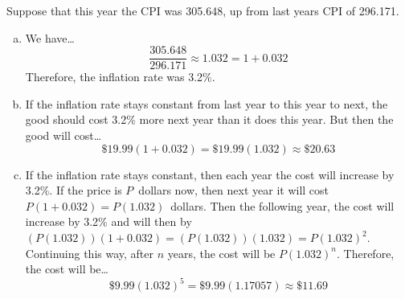 \documentclass[12pt,letterpaper]{exam}
\begin{document}
\begin{questions}
\newpage
\question Suppose that this year the CPI was 305.648, up from last years CPI of 296.171. 
	 \pspace

{\itshape
\sol 
\begin{enumerate}[(a)]
\item We have\dots
	\[
	\dfrac{305.648}{296.171} \approx 1.032= 1 + 0.032
	\] \pspace
Therefore, the inflation rate was 3.2\%. \pspace

\item If the inflation rate stays constant from last year to this year to next, the good should cost 3.2\% more next year than it does this year. But then the good will cost\dots
	\[
	\$19.99 (1 + 0.032)= \$19.99 (1.032) \approx \$20.63 
	\] \pspace

\item If the inflation rate stays constant, then each year the cost will increase by 3.2\%. If the price is $P$~dollars now, then next year it will cost $P(1 + 0.032)= P(1.032)$~dollars. Then the following year, the cost will increase by 3.2\% and will then by $(P(1.032))(1 + 0.032)= (P(1.032))(1.032)= P(1.032)^2$. Continuing this way, after $n$ years, the cost will be $P(1.032)^n$. Therefore, the cost will be\dots
	\[
	\$9.99 (1.032)^5= \$9.99 (1.17057) \approx \$11.69
	\] \pspace


\end{enumerate}}
\end{questions}
\end{document}
